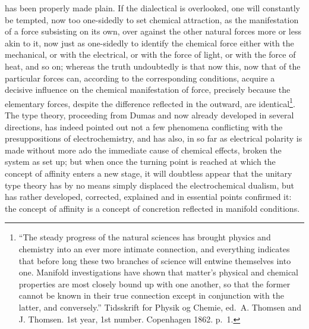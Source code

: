 \documentclass[12pt,a4paper]{book}
\begin{document}
\setcounter{footnote}{0}
has been properly made plain. If the dialectical is overlooked, one will
constantly be tempted, now too one-sidedly to set chemical attraction, as the
manifestation of a force subsisting on its own, over against the other natural
forces more or less akin to it, now just as one-sidedly to identify the
chemical force either with the mechanical, or with the electrical, or with the
force of light, or with the force of heat, and so on; whereas the truth
undoubtedly is that now this, now that of the particular forces can, according
to the corresponding conditions, acquire a decisive influence on the chemical
manifestation of force, precisely because the elementary forces, despite the
difference reflected in the outward, are identical\footnote{``The steady
progress of the natural sciences has brought physics and chemistry into an
ever more intimate connection, and everything indicates that before long these
two branches of science will entwine themselves into one. Manifold
investigations have shown that matter's physical and chemical properties are
most closely bound up with one another, so that the former cannot be known in
their true connection except in conjunction with the latter, and conversely.''
Tidsskrift for Physik og Chemie, ed.\ A. Thomsen and J. Thomsen. 1st year,
1st number. Copenhagen 1862. p.~1.}. The type theory, proceeding from Dumas
and now already developed in several directions, has indeed pointed out not a
few phenomena conflicting with the presuppositions of electrochemistry, and
has also, in so far as electrical polarity is made without more ado the
immediate cause of chemical effects, broken the system as set up; but when once
the turning point is reached at which the concept of affinity enters a new
stage, it will doubtless appear that the unitary type theory has by no means
simply displaced the electrochemical dualism, but has rather developed,
corrected, explained and in essential points confirmed it: the concept of
affinity is a concept of concretion reflected in manifold conditions.
\end{document}
